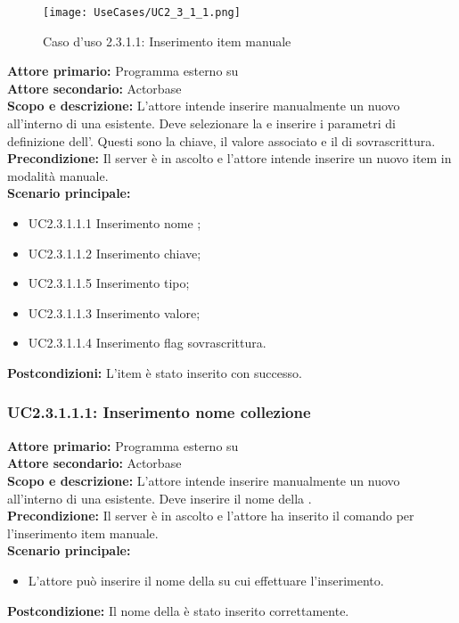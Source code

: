 \documentclass{scalatekids-article}
\begin{document}
\begin{figure}[H]
  \begin{center}
    \texttt{[image: UseCases/UC2\_3\_1\_1.png]}
    \caption{Caso d'uso 2.3.1.1: Inserimento item manuale}
  \end{center}
\end{figure}
\textbf{Attore primario:} Programma esterno su \\
\textbf{Attore secondario:} Actorbase\\
\textbf{Scopo e descrizione:} L'attore intende inserire manualmente un nuovo  all'interno di una  esistente. Deve selezionare la  e inserire i parametri di definizione dell'. Questi sono la chiave, il valore associato e il  di sovrascrittura.\\
\textbf{Precondizione:} Il server è in ascolto e l'attore intende inserire un nuovo item in modalità manuale.\\
\textbf{Scenario principale:}
\begin{itemize}
\item UC2.3.1.1.1 Inserimento nome ;
\item UC2.3.1.1.2 Inserimento chiave;
\item UC2.3.1.1.5 Inserimento tipo;
\item UC2.3.1.1.3 Inserimento valore;
\item UC2.3.1.1.4 Inserimento flag sovrascrittura.
\end{itemize}
\textbf{Postcondizioni:} L'item è stato inserito con successo.

\subsubsection{UC2.3.1.1.1: Inserimento nome collezione}

\textbf{Attore primario:} Programma esterno su \\
\textbf{Attore secondario:} Actorbase\\
\textbf{Scopo e descrizione:} L'attore intende inserire manualmente un nuovo  all'interno di una  esistente. Deve inserire il nome della .\\
\textbf{Precondizione:} Il server è in ascolto e l'attore ha inserito il comando per l'inserimento item manuale.\\
\textbf{Scenario principale:}
\begin{itemize}
\item L'attore può inserire il nome della  su cui effettuare l'inserimento.
\end{itemize}
\textbf{Postcondizione:} Il nome della  è stato inserito correttamente.
\end{document}
